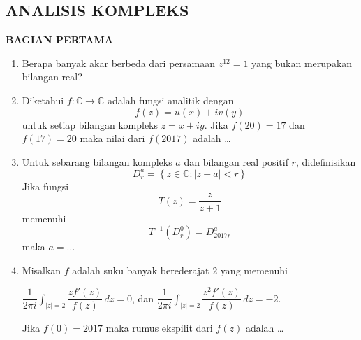 \documentclass[12pt,twoside]{article}
\begin{document}
\subsection{ANALISIS KOMPLEKS}
\textbf{BAGIAN PERTAMA}
\begin{enumerate}
	\item Berapa banyak akar berbeda dari persamaan $z^{12}= 1$ yang bukan merupakan bilangan real?

	\item Diketahui $f: \mathbb{C} \to \mathbb{C}$ adalah fungsi analitik dengan
	      \begin{equation*}
		      f(z) = u(x)+iv(y)
	      \end{equation*}
	      untuk setiap bilangan kompleks $z = x+iy$. Jika $f(20)=17$ dan $f(17)=20$ maka nilai dari $f(2017)$ adalah \dots

	\item Untuk sebarang bilangan kompleks $a$ dan bilangan real positif $r$, didefinisikan
	      \begin{equation*}
		      D^a_r = \left\lbrace z \in \mathbb{C} : |z-a|<r \right\rbrace
	      \end{equation*}
	      Jika fungsi
	      \begin{equation*}
		      T(z) = \dfrac{z}{z+1}
	      \end{equation*}
	      memenuhi
	      \begin{equation*}
		      T^{-1}(D^0_r) = D^a_{2017r}
	      \end{equation*}
	      maka $a =\dots$

	\item Misalkan $f$ adalah suku banyak berederajat $2$ yang memenuhi
	      \begin{center}
		      $\displaystyle\dfrac{1}{2 \pi i} \int_{|z|=2}^{}\dfrac{zf'(z)}{f(z)} \, dz = 0$, dan $\displaystyle\dfrac{1}{2 \pi i} \int_{|z|=2}^{}\dfrac{z^2f'(z)}{f(z)} \, dz = -2$.
	      \end{center}
	      Jika $f(0) = 2017$ maka rumus ekspilit dari $f(z)$ adalah \dots
\end{enumerate}
\end{document}

